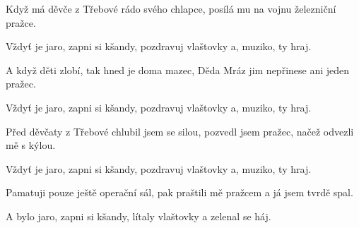 \beginverse{}
Když má děvče z Třebové rádo svého chlapce,
posílá mu na vojnu železniční pražce.
\endverse{}

\beginchorus{}
Vždyť je jaro, zapni si kšandy,
pozdravuj vlaštovky a, muziko, ty hraj.
\endchorus{}

\beginverse{}
A když děti zlobí, tak hned je doma mazec,
Děda Mráz jim nepřinese ani jeden pražec.
\endverse{}

\beginchorus{}
Vždyť je jaro, zapni si kšandy,
pozdravuj vlaštovky a, muziko, ty hraj.
\endchorus{}

\beginverse{}
Před děvčaty z Třebové chlubil jsem se silou,
pozvedl jsem pražec, načež odvezli mě s kýlou.
\endverse{}

\beginchorus{}
Vždyť je jaro, zapni si kšandy,
pozdravuj vlaštovky a, muziko, ty hraj.
\endchorus{}

\beginverse{}
Pamatuji pouze ještě operační sál,
pak praštili mě pražcem a já jsem tvrdě spal.
\endverse{}

\beginchorus{}
A bylo jaro, zapni si kšandy,
lítaly vlaštovky a zelenal se háj.
\endchorus{}

\endsong{}
